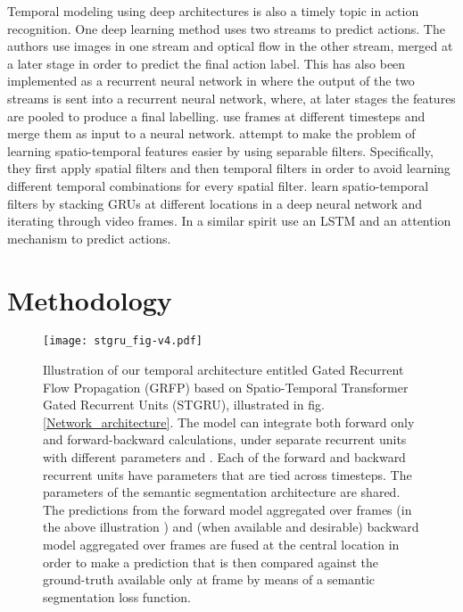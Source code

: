 \documentclass[10pt,twocolumn,letterpaper]{article}
\begin{document}
Temporal modeling using deep architectures is also a timely topic in action recognition. One deep learning method \cite{simonyan2014two} uses two streams to predict actions. The authors use images in one stream and optical flow in the other stream, merged at a later stage in order to predict the final action label. This has also been implemented as a recurrent neural network in \cite{yue2015beyond} where the output of the two streams is sent into a recurrent neural network, where, at later stages the features are pooled to produce a final labelling. \cite{karpathy2014large} use frames at different timesteps and merge them as input to a neural network. \cite{sun2015human} attempt to make the problem of learning spatio-temporal features easier by using separable filters. Specifically, they first apply spatial filters and then temporal filters in order to avoid learning different temporal combinations for every spatial filter. \cite{ballas2015delving} learn spatio-temporal filters by stacking GRUs at different locations in a deep neural network and iterating through video frames. In a similar spirit \cite{li2016videolstm} use an LSTM and an attention mechanism to predict actions.


\section{Methodology}


\begin{figure*}
\begin{center}
\texttt{[image: stgru\_fig-v4.pdf]}
\caption{Illustration of our temporal architecture entitled Gated Recurrent Flow Propagation (GRFP) based on Spatio-Temporal Transformer Gated Recurrent Units (STGRU), illustrated in fig.\ref{Network_architecture}. The model can integrate both forward only and forward-backward calculations, under separate recurrent units with different parameters  and . Each of the forward and backward recurrent units have parameters that are tied across timesteps. The parameters of the semantic segmentation architecture are shared. The predictions from the forward model aggregated over frames  (in the above illustration ) and (when available and desirable) backward model aggregated over frames  are fused at the central location  in order to make a prediction that is then compared against the ground-truth available only at frame  by means of a semantic segmentation loss function.}
\label{training_figure}
\end{center}
\end{figure*}
\end{document}

